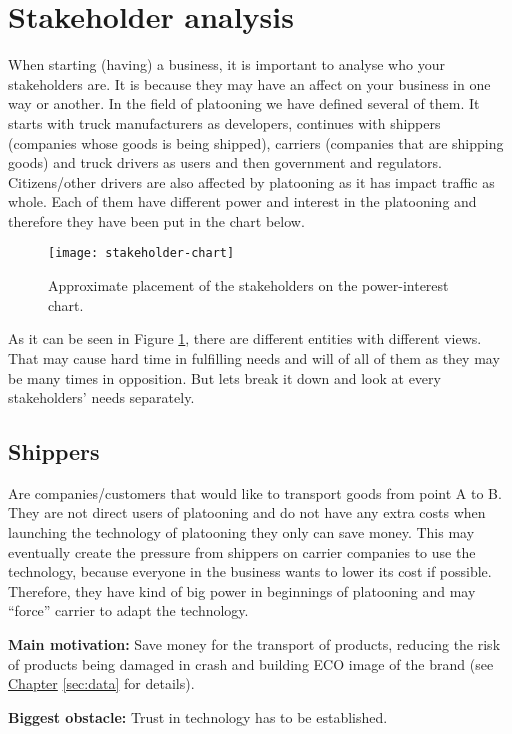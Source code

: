\section{Stakeholder analysis}\label{sec:stakeholders}

\begin{center}
\end{center}
% 
% 
When starting (having) a business, it is important to analyse who your stakeholders are. It is because they may have an affect on your business in one way or another. In the field of platooning we have defined several of them. It starts with truck manufacturers as developers, continues with shippers (companies whose goods is being shipped), carriers (companies that are shipping goods) and truck drivers as users and then government and regulators. Citizens/other drivers are also affected by platooning as it has impact traffic as whole. Each of them have different power and interest in the platooning and therefore they have been put in the chart below.\par
% 
\begin{figure}[h]
    \centering
    \texttt{[image: stakeholder-chart]}
    \caption{Approximate placement of the stakeholders on the power-interest chart.}
    \label{fig:stakeholder-chart}
\end{figure}
% 
As it can be seen in Figure \ref{fig:stakeholder-chart}, there are different entities with different views. That may cause hard time in fulfilling needs and will of all of them as they may be many times in opposition. But lets break it down and look at every stakeholders’ needs separately.\par
% 
\subsection{Shippers}
Are companies/customers that would like to transport goods from point A to B. They are not direct users of platooning and do not have any extra costs when launching the technology of platooning they only can save money. This may eventually create the pressure from shippers on carrier companies to use the technology, because everyone in the business wants to lower its cost if possible. Therefore, they have kind of big power in beginnings of platooning and may “force” carrier to adapt the technology.
% 
% 
\par \textbf{Main motivation:} Save money for the transport of products, reducing the risk of products being damaged in crash and building ECO image of the brand (see \hyperref[sec:data]{Chapter} \ref{sec:data} for details).
%
\par \textbf{Biggest obstacle:} Trust in technology has to be established.
% 
% 
